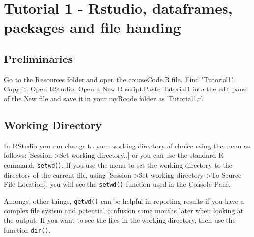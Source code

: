 \documentclass[titlepage]{book}\usepackage{knitr}
\begin{document}






\chapter{Tutorial 1 - Rstudio, dataframes, packages and file handing}
\label{Tutorial1}

\author{Brian Williams $<$\href{mailto:bjw649@gmail.com}%
{bjw649@gmail.com}$>$}

\section{Preliminaries}

Go to the Resources folder and open the courseCode.R file.  Find "Tutorial1". Copy it.  Open RStudio. Open a New R script.Paste Tutorial1 into the edit pane of the New file and save it in your myRcode folder as 'Tutorial1.r'.

\section{Working Directory}

In RStudio you can change to your working directory of choice using the menu as follows: [Session->Set working directory\...] or you can use the standard R command, \texttt{setwd()}.  If you use the menu to set the working directory to the directory of the current file, using [Session->Set working directory->To Source File Location], you will see the  \texttt{setwd()} function used in the Console Pane.


\begin{knitrout}
\color{fgcolor}\begin{kframe}
\begin{alltt}
\hlstd{()}
\end{alltt}
\end{kframe}
\end{knitrout}
Amongst other things, \texttt{getwd()} can be helpful in reporting results if you have a complex file system and potential confusion some months later when looking at the output.
If you want to see the files in the working directory, then use the function \texttt{dir()}.

\begin{knitrout}
\color{fgcolor}\begin{kframe}
\begin{alltt}
\hlstd{()}
\end{alltt}
\end{kframe}
\end{knitrout}
\end{document}
